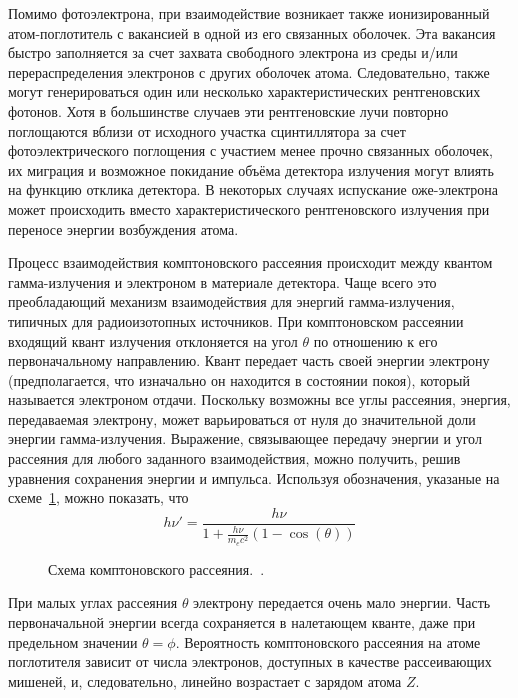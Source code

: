 Помимо фотоэлектрона, при взаимодействие возникает также ионизированный атом-поглотитель с вакансией в одной из его связанных оболочек. Эта вакансия быстро заполняется за счет захвата свободного электрона из среды и/или перераспределения электронов с других оболочек атома. Следовательно, также могут генерироваться один или несколько характеристических рентгеновских фотонов. Хотя в большинстве случаев эти рентгеновские лучи повторно поглощаются вблизи от исходного участка сцинтиллятора за счет фотоэлектрического поглощения с участием менее прочно связанных оболочек, их миграция и возможное покидание объёма детектора излучения могут влиять на функцию отклика детектора. В некоторых случаях испускание оже-электрона может происходить вместо характеристического рентгеновского излучения при переносе энергии возбуждения атома.~\cite{Knoll2010}

Процесс взаимодействия комптоновского рассеяния происходит между квантом гамма-излучения и электроном в материале детектора. Чаще всего это преобладающий механизм взаимодействия для энергий гамма-излучения, типичных для радиоизотопных источников. При комптоновском рассеянии входящий квант излучения отклоняется на угол $\theta$ по отношению к его первоначальному направлению. Квант передает часть своей энергии электрону (предполагается, что изначально он находится в состоянии покоя), который называется электроном отдачи. Поскольку возможны все углы рассеяния, энергия, передаваемая электрону, может варьироваться от нуля до значительной доли энергии гамма-излучения. Выражение, связывающее передачу энергии и угол рассеяния для любого заданного взаимодействия, можно получить, решив уравнения сохранения энергии и импульса. Используя обозначения, указаные на схеме~\ref{fig:electronComptonScattering}, можно показать, что
\begin{equation*}
  h \nu' = \frac{ h \nu }{ 1 + \frac{h \nu }{ m_e c^2  } ( 1 - \cos(\theta) ) }
\end{equation*}

\begin{figure}[ht]
  \caption{ Схема комптоновского рассеяния.~\cite{Knoll2010}.}
  \label{fig:electronComptonScattering}
\end{figure}

При малых углах рассеяния $\theta$ электрону передается очень мало энергии. Часть первоначальной энергии всегда сохраняется в налетающем кванте, даже при предельном значении $\theta = \phi$. Вероятность комптоновского рассеяния на атоме поглотителя зависит от числа электронов, доступных в качестве рассеивающих мишеней, и, следовательно, линейно возрастает с зарядом атома $Z$.~\cite{Knoll2010}

